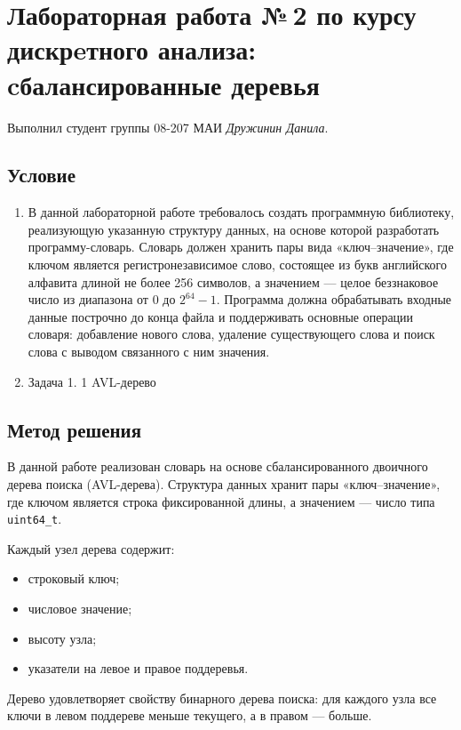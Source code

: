 \documentclass[12pt]{article}
\begin{document}
\section*{Лабораторная работа №\,2 по курсу дискрeтного анализа: cбалансированные деревья}

Выполнил студент группы 08-207 МАИ \textit{Дружинин Данила}.

\subsection*{Условие}

 
\begin{enumerate}
\item В данной лабораторной работе требовалось создать программную библиотеку, реализующую указанную структуру данных, на основе которой разработать программу-словарь. Словарь должен хранить пары вида «ключ--значение», где ключом является регистронезависимое слово, состоящее из букв английского алфавита длиной не более 256 символов, а значением --- целое беззнаковое число из диапазона от 0 до $2^{64} - 1$. Программа должна обрабатывать входные данные построчно до конца файла и поддерживать основные операции словаря: добавление нового слова, удаление существующего слова и поиск слова с выводом связанного с ним значения. 
\item Задача 1. 1 AVL-дерево
\end{enumerate}

\subsection*{Метод решения}

В данной работе реализован словарь на основе сбалансированного двоичного дерева поиска (AVL-дерева). Структура данных хранит пары «ключ--значение», где ключом является строка фиксированной длины, а значением --- число типа \texttt{uint64\_t}.

Каждый узел дерева содержит:
\begin{itemize}
	\item строковый ключ;
	\item числовое значение;
	\item высоту узла;
	\item указатели на левое и правое поддеревья.
\end{itemize}

Дерево удовлетворяет свойству бинарного дерева поиска: для каждого узла все ключи в левом поддереве меньше текущего, а в правом --- больше.
\end{document}

